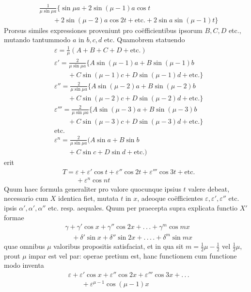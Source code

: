 \[
\begin{aligned}
&\frac1{\mu\sin\mu a}\{\sin\mu a+2\sin(\mu-1)a\cos t\\[5pt]
&\qquad{}+2\sin(\mu-2)a\cos2t+\text{etc.}+2\sin a\sin(\mu-1)t\}
\end{aligned}
\]
Prorsus similes expressiones proveniunt pro coëfficientibus ipsorum $B,C,D$ etc., mutando tantummodo $a$ in $b,c,d$ etc. Quamobrem statuendo
\[
\begin{aligned}
&\varepsilon=\frac1\mu(A+B+C+D+\text{etc.})\\[5pt]
&\varepsilon'=\frac2{\mu\sin\mu a}\{A\sin(\mu-1)a+B\sin(\mu-1)b\\[5pt]
&\qquad{}+C\sin(\mu-1)c+D\sin(\mu-1)d+\text{etc.}\}\\[5pt]
&\varepsilon''=\frac2{\mu\sin\mu a}\{A\sin(\mu-2)a+B\sin(\mu-2)b\\[5pt]
&\qquad{}+C\sin(\mu-2)c+D\sin(\mu-2)d+\text{etc.}\}\\[5pt]
&\varepsilon'''=\frac2{\mu\sin\mu a}\{A\sin(\mu-3)a+B\sin(\mu-3)b\\[5pt]
&\qquad{}+C\sin(\mu-3)c+D\sin(\mu-3)d+\text{etc.}\}\\[5pt]
&\text{etc.}\\[5pt]
&\varepsilon^{n}=\frac2{\mu\sin\mu a}(A\sin a+B\sin b\\[5pt]
&\qquad{}+C\sin c+D\sin d+\text{etc.})
\end{aligned}
\]
erit
\[
\begin{aligned}
&T=\varepsilon+\varepsilon'\cos t+\varepsilon''\cos2t+\varepsilon'''\cos3t+\text{etc.}\\[5pt]
&\qquad{}+\varepsilon^{n}\cos nt
\end{aligned}
\]
Quum haec formula generaliter pro valore quocunque ipsius $t$ valere debeat, necessario cum $X$ identica fiet, mutata $t$ in $x$, adeoque coëfficientes $\varepsilon,\varepsilon',\varepsilon''$ etc. ipsis $\alpha',\alpha',\alpha''$ etc. resp. aequales.
Quum per praecepta supra explicata functio $X'$ formae
\[
\begin{aligned}
&\gamma+\gamma'\cos x+\gamma''\cos2x+.\,.\,.+\gamma^{m}\cos mx\\[5pt]
&\quad+\delta'\sin x+\delta''\sin2x+.\,.\,.\,.+\delta^{m}\sin mx
\end{aligned}
\]
quae omnibus $\mu$ valoribus propositis satisfaciat, et in qua sit $m=\frac12\mu-\frac12$ vel $\frac12\mu$, prout $\mu$ impar est vel par: operae pretium est, hanc functionem cum functione modo inventa
\[
\begin{aligned}
&\varepsilon+\varepsilon'\cos x+\varepsilon''\cos2x+\varepsilon'''\cos3x+.\,.\,.\\[5pt]
&\qquad{}+\varepsilon^{\mu-1}\cos(\mu-1)x
\end{aligned}
\]
\endgroup
